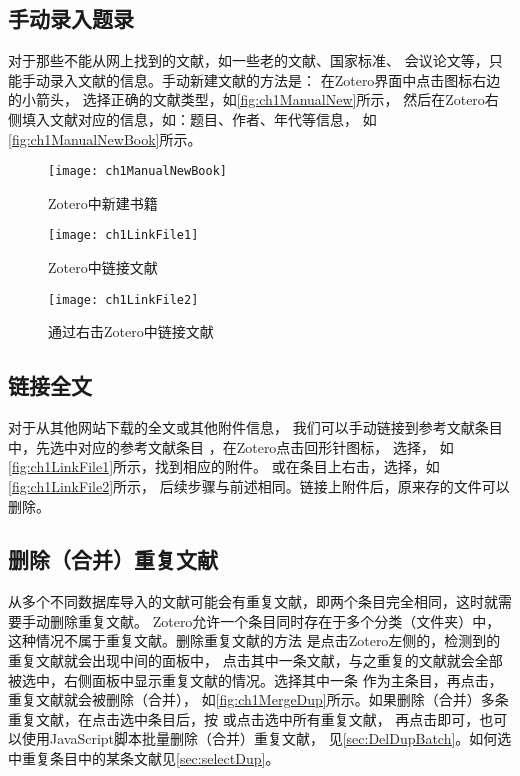\documentclass[cn,11pt,chinese]{elegantbook}
\begin{document}
	\subsection{手动录入题录}\label{sec:ManualImport}
	对于那些不能从网上找到的文献，如一些老的文献、国家标准、
	会议论文等，只能手动录入文献的信息。手动新建文献的方法是：
	在Zotero界面中点击\menu{+}图标右边的小箭头，
	选择正确的文献类型，如\autoref{fig:ch1ManualNew}所示，
	然后在Zotero右侧填入文献对应的信息，如：题目、作者、年代等信息，
	如\autoref{fig:ch1ManualNewBook}所示。
			\begin{figure}
					\centering
					\begin{minipage}[t]{\dimexpr0.5\textwidth-4em}
					\centering
					\texttt{[image: ch1ManualNewBook]}
					\caption{Zotero中新建书籍}
					\label{fig:ch1ManualNewBook}
				\end{minipage}	
				\hspace{2cm}
				\begin{minipage}[t]{\dimexpr0.5\textwidth-4em}
					\centering
					\texttt{[image: ch1LinkFile1]}
					\caption{Zotero中链接文献}
					\label{fig:ch1LinkFile1}
				\end{minipage}	
			\end{figure}
			\begin{figure}
				\centering
				\texttt{[image: ch1LinkFile2]}
				\caption{通过右击Zotero中链接文献}
				\label{fig:ch1LinkFile2}
			\end{figure}

		\subsection{链接全文}\label{sec:linkFulltex}
				对于从其他网站下载的全文或其他附件信息，
				我们可以手动链接到参考文献条目中，先选中对应的参考文献条目
				，在Zotero点击回形针图标，
				选择，
				如\autoref{fig:ch1LinkFile1}所示，找到相应的附件。
				或在条目上右击，选择，如\autoref{fig:ch1LinkFile2}所示，
				后续步骤与前述相同。链接上附件后，原来存的文件可以删除。

		\subsection{删除（合并）重复文献}\label{sec:delDup}
				从多个不同数据库导入的文献可能会有重复文献，即两个条目完全相同，这时就需要手动删除重复文献。
				Zotero允许一个条目同时存在于多个分类（文件夹）中，这种情况不属于重复文献。删除重复文献的方法
				是点击Zotero左侧的，检测到的重复文献就会出现中间的面板中，
				点击其中一条文献，与之重复的文献就会全部被选中，右侧面板中显示重复文献的情况。选择其中一条
				作为主条目，再点击，重复文献就会被删除（合并），
				如\autoref{fig:ch1MergeDup}所示。如果删除（合并）多条重复文献，在点击选中条目后，按
				或点击选中所有重复文献，
				再点击即可，也可以使用JavaScript脚本批量删除（合并）重复文献，
				见\cref{sec:DelDupBatch}。如何选中重复条目中的某条文献见\cref{sec:selectDup}。
\end{document}
